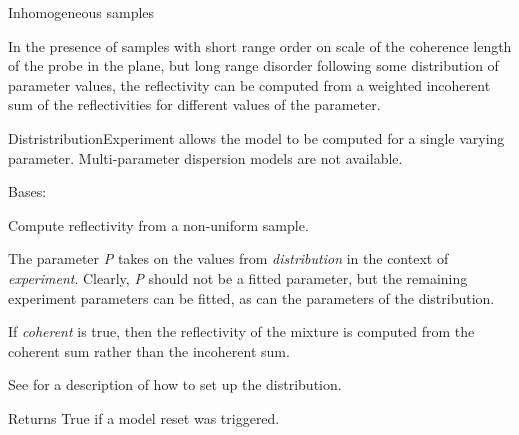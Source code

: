 \documentclass[letterpaper,10pt,english]{sphinxmanual}
\begin{document}
\label{api/dist:module-refl1d.dist}
Inhomogeneous samples

In the presence of samples with short range order on scale of the coherence
length of the probe in the plane, but long range disorder following some
distribution of parameter values, the reflectivity can be computed from
a weighted incoherent sum of the reflectivities for different values of
the parameter.

DistristributionExperiment allows the model to be computed for a single
varying parameter.  Multi-parameter dispersion models are not available.

\begin{fulllineitems}
\label{api/dist:refl1d.dist.DistributionExperiment}
Bases: {\hyperref[api/experiment:refl1d.experiment.ExperimentBase]{}}

Compute reflectivity from a non-uniform sample.

The parameter \emph{P} takes on the values from \emph{distribution} in the
context of \emph{experiment}. Clearly, \emph{P} should not be a fitted
parameter, but the remaining experiment parameters can be fitted,
as can the parameters of the distribution.

If \emph{coherent} is true, then the reflectivity of the mixture is computed
from the coherent sum rather than the incoherent sum.

See {\hyperref[api/dist:refl1d.dist.Weights]{}} for a description of how to set up the distribution.

\begin{fulllineitems}
\label{api/dist:refl1d.dist.DistributionExperiment.format_parameters}
\end{fulllineitems}


\begin{fulllineitems}
\label{api/dist:refl1d.dist.DistributionExperiment.is_reset}
Returns True if a model reset was triggered.


\end{fulllineitems}
\end{fulllineitems}
\end{document}
